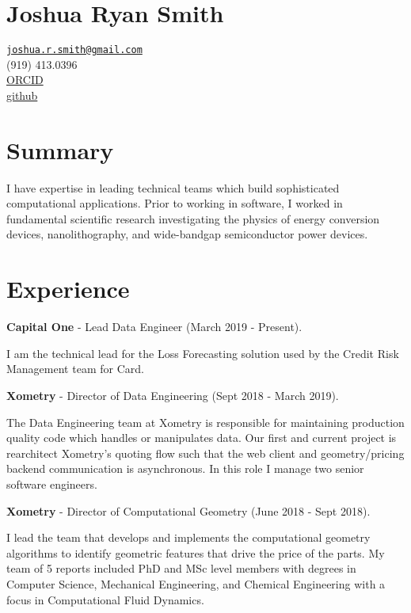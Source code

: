 \section{Joshua Ryan Smith}\label{joshua-ryan-smith}

\href{mailto:joshua.r.smith@gmail.com}{\nolinkurl{joshua.r.smith@gmail.com}}\\
(919) 413.0396\\
\href{http://orcid.org/0000-0002-3137-7180}{ORCID}\\
\href{http://github.com/jrsmith3}{github}

\section{Summary}\label{summary}

I have expertise in leading technical teams which build sophisticated
computational applications. Prior to working in software, I worked in
fundamental scientific research investigating the physics of energy
conversion devices, nanolithography, and wide-bandgap semiconductor
power devices.

\section{Experience}\label{experience}

\textbf{Capital One} - Lead Data Engineer (March 2019 - Present).

I am the technical lead for the Loss Forecasting solution used by the
Credit Risk Management team for Card.

\textbf{Xometry} - Director of Data Engineering (Sept 2018 - March
2019).

The Data Engineering team at Xometry is responsible for maintaining
production quality code which handles or manipulates data. Our first and
current project is rearchitect Xometry's quoting flow such that the web
client and geometry/pricing backend communication is asynchronous. In
this role I manage two senior software engineers.

\textbf{Xometry} - Director of Computational Geometry (June 2018 - Sept
2018).

I lead the team that develops and implements the computational geometry
algorithms to identify geometric features that drive the price of the
parts. My team of 5 reports included PhD and MSc level members with
degrees in Computer Science, Mechanical Engineering, and Chemical
Engineering with a focus in Computational Fluid Dynamics.

